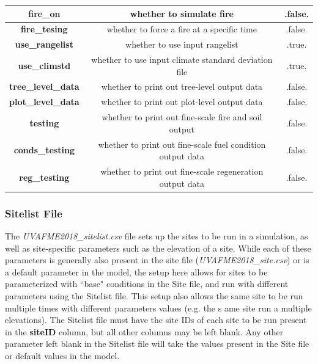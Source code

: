 \documentclass[a4paper, 12pt] {article}
\begin{document}
\begin{table}
\begin{center}
{\begin{tabular}{|c|c|c|}
\Xhline{5\arrayrulewidth}
\textbf{fire\_on} & whether to simulate fire &  .false.\\
\hline 
\textbf{fire\_tesing} & whether to force a fire at a specific time &  .false.\\
\Xhline{5\arrayrulewidth}
\textbf{use\_rangelist} & whether to use input rangelist &  .true.\\
\hline 
\textbf{use\_climstd} & whether to use input climate standard deviation file &  .true.\\
\hline
\textbf{tree\_level\_data} & whether to print out tree-level output data &  .false.\\
\hline 
\textbf{plot\_level\_data} & whether to print out plot-level output data &  .false.\\
\hline 
\textbf{testing} & whether to print out fine-scale fire and soil output &  .false.\\
\hline 
\textbf{conds\_testing} & whether to print out fine-scale fuel condition output data &  .false.\\
\hline
\textbf{reg\_testing} & whether to print out fine-scale regeneration output data &  .false.\\
\hline
\end{tabular}}
\end{center}
\end{table}

\subsubsection{Sitelist File}
The \textit{UVAFME2018\_sitelist.csv} file sets up the sites to be run in a simulation, as well as site-specific parameters such as the elevation of a site. While each of these parameters is generally also present in the site file (\textit{UVAFME2018\_site.csv}) or is a default parameter in the model, the setup here allows for sites to be parameterized with ``base" conditions in the Site file, and run with different parameters using the Sitelist file. This setup also allows the same site to be run multiple times with different parameters values (e.g. the s ame site run a multiple elevations). The Sitelist file must have the site IDs of each site to be run present in the \textbf{siteID} column, but all other columns may be left blank. Any other parameter left blank in the Sitelist file will take the values present in the Site file or default values in the model.
\end{document}
